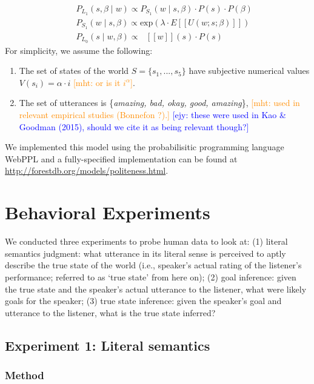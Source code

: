 \documentclass[10pt,letterpaper]{article}
\newcommand{\denote}[1]{\mbox{ $[\![ #1 ]\!]$}}
\newcommand{\mht}[1]{\textcolor{DarkOrange}{[mht: #1]}}
\newcommand{\ejy}[1]{\textcolor{Blue}{[ejy: #1]}}
\begin{document}
%
\begin{eqnarray}
&&P_{L_1}(s, \beta \mid w)\propto P_{S_1}(w \mid s, \beta)\cdot P(s) \cdot P(\beta) \label{eq:L1}\\
&&P_{S_1}(w \mid s, \beta) \propto \mathrm{exp}(\lambda \cdot E[[U(w; s; \beta)]])\label{eq:S1}\\
&&P_{L_0}(s \mid w, \beta)\propto \denote{w}(s) \cdot P(s) \label{eq:L0}
\end{eqnarray}
%
For simplicity, we assume the following:
\begin{enumerate}
\item The set of states of the world $S = \{s_{1}, ...,  s_{5}\}$ have subjective numerical values $V(s_{i}) = \alpha \cdot i$ \mht{or is it $i^\alpha$}. 
\item The set of utterances is \{\emph{amazing, bad, okay, good, amazing}\},
  \mht{used in relevant empirical studies (Bonnefon ?).}
   \ejy{these were used in Kao \& Goodman (2015), should we cite it as being relevant though?}
\end{enumerate}

We implemented this model using the probabilisitic programming language WebPPL \cite{dippl} and a fully-specified implementation can be found at \url{http://forestdb.org/models/politeness.html}.


\section{Behavioral Experiments}

We conducted three experiments to probe human data to look at: (1) literal semantics judgment: what utterance in its literal sense is perceived to aptly describe the true state of the world (i.e., speaker's actual rating of the listener's performance; referred to as `true state' from here on); (2) goal inference: given the true state and the speaker's actual utterance to the listener, what were likely goals for the speaker; (3) true state inference: given the speaker's goal and utterance to the listener, what is the true state inferred?

\subsection{Experiment 1: Literal semantics}

\subsubsection{Method}
\end{document}
